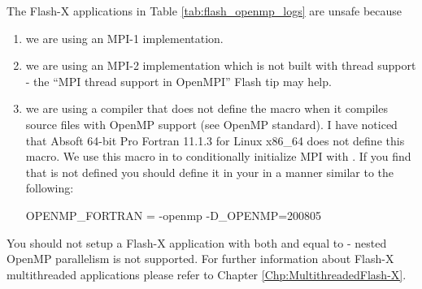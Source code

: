 The Flash-X applications in Table \ref{tab:flash_openmp_logs} are unsafe
because

\begin{enumerate}
\item we are using an MPI-1 implementation.

\item we are using an MPI-2 implementation which is not built with
  thread support - the ``MPI thread support in OpenMPI'' Flash tip may
  help.

\item we are using a compiler that does not define the macro
   when it compiles source files with OpenMP support
  (see OpenMP standard).  I have noticed that Absoft 64-bit Pro
  Fortran 11.1.3 for Linux x86\_64 does not define this macro.  We use
  this macro in  to conditionally
  initialize MPI with .  If you find that
   is not defined you should define it in your
   in a manner similar to the following:
\begin{codeseg}
OPENMP_FORTRAN = -openmp -D_OPENMP=200805
\end{codeseg}

\end{enumerate}

You should not setup a Flash-X application with both
 and  equal to
 - nested OpenMP parallelism is not supported.  For further
information about Flash-X multithreaded applications please refer to
Chapter \ref{Chp:MultithreadedFlash-X}.

